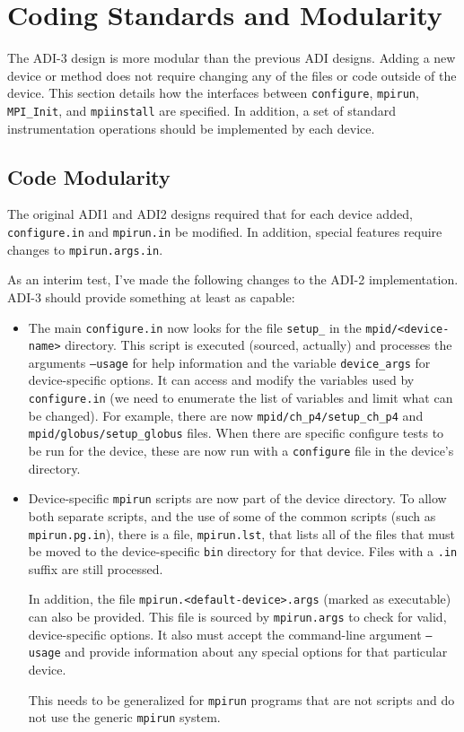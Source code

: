 \documentclass{article}
\let\file=\texttt
\let\code=\texttt
\begin{document}
\section{Coding Standards and Modularity}
The ADI-3 design is more modular than the previous ADI designs.  Adding a new
device or method does not require changing any of the files or code outside
of the device.  This section details how the interfaces between
\code{configure}, \code{mpirun}, \code{MPI\_Init}, and \code{mpiinstall} are
specified.  In addition, a set of standard instrumentation operations should
be implemented by each device.

\subsection{Code Modularity}
The original ADI1 and ADI2 designs required that for each device added, 
\file{configure.in} and \file{mpirun.in} be modified.  In addition, special
features require changes to \file{mpirun.args.in}.  

As an interim test, I've made the following changes to the ADI-2
implementation.  ADI-3 should provide something at least as capable:
\begin{itemize}
\item The main \file{configure.in} now looks for the file
  \file{setup\_<device-name>} in the \file{mpid/<device-name>} directory.
  This script is executed (sourced, actually) and processes the arguments
  \texttt{--usage} for   help information and the variable
  \texttt{device\_args} for device-specific options.  It can access and modify
  the variables used by \file{configure.in} (we need to enumerate the list of
  variables and limit what can be changed).  For example, there are now
  \file{mpid/ch\_p4/setup\_ch\_p4} and \file{mpid/globus/setup\_globus} files.
  When there are specific configure tests to be run for the device, these are
  now run with a \file{configure} file in the device's directory.

\item Device-specific \file{mpirun} scripts are now part of the device
  directory.  To allow both separate scripts, and the use of some of the
  common scripts (such as \file{mpirun.pg.in}), there is a file,
  \file{mpirun.lst}, that lists all of the files that must be moved to the
  device-specific \file{bin} directory for that device.  Files with a
  \file{.in} suffix are still processed.

  In addition, the file \file{mpirun.<default-device>.args} (marked as 
  executable) can also be provided.  This file is sourced by
  \file{mpirun.args} to check for valid, device-specific options.  It also
  must accept the command-line argument \texttt{--usage} and provide 
  information about any special options for that particular device.

  This needs to be generalized for \code{mpirun} programs that are not scripts
  and do not use the generic \code{mpirun} system.
\end{itemize}
\end{document}
